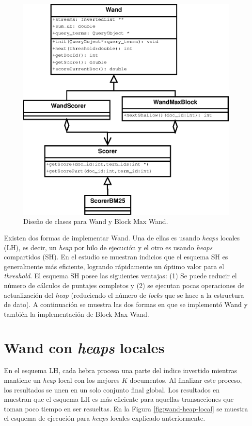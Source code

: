 \begin{figure}[!th]
\centering
\includegraphics[scale=.75]{images/WAND.eps}
\caption{Diseño de clases para Wand y Block Max Wand.}
\label{fig:diagramawand}
\end{figure}

Existen dos formas de implementar Wand. Una de ellas es usando \textit{heaps} locales (LH), es decir, un \textit{heap} por hilo de ejecución y el otro es usando \textit{heaps} compartidos (SH). En el estudio \citep{Rojas:2013} se muestran indicios que el esquema SH es generalmente más eficiente, logrando rápidamente un óptimo valor para el \textit{threshold}. El esquema SH posee las siguientes ventajas: (1) Se puede reducir el número de cálculos de puntajes completos y (2) se ejecutan pocas operaciones de actualización del \textit{heap} (reduciendo el número de \textit{locks} que se hace a la estructura de dato). 
A continuación se muestra las dos formas en que se implementó Wand y también la implementación de Block Max Wand.


\section{Wand con \textit{heaps} locales}
\label{scheduling:wlh}
En el esquema LH, cada hebra procesa una parte del índice invertido mientras mantiene un \textit{heap} local con los mejores $K$ documentos. Al finalizar este proceso, los resultados se unen en un solo conjunto final global. Los resultados en \citep{Rojas:2013} muestran que el esquema LH es más eficiente para aquellas transacciones que toman poco tiempo en ser resueltas. En la Figura \ref{fig:wand-heap-local} se muestra el esquema de ejecución para \textit{heaps} locales explicado anteriormente. 

